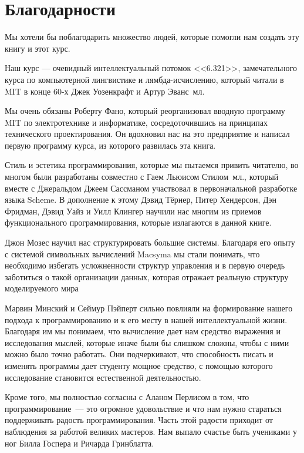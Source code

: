 \chapter*{Благодарности}
\thispagestyle{empty}
Мы хотели бы поблагодарить множество людей, которые помогли
нам создать эту книгу и этот курс.

Наш курс --- очевидный интеллектуальный потомок <<6.321>>,
замечательного курса по компьютерной лингвистике и лямбда-исчислению,
который читали в MIT в конце 60-х Джек Уозенкрафт и Артур Эванс~мл.

Мы очень обязаны Роберту Фано, который реорганизовал вводную 
программу MIT по электротехнике и информатике, сосредоточившись на
принципах технического проектирования.  Он вдохновил нас на это
предприятие и написал первую программу курса, из которого развилась
эта книга.

Стиль и эстетика программирования, которые мы
пытаемся привить читателю, во многом были разработаны совместно с Гаем
Льюисом Стилом~мл., 
который вместе с Джеральдом Джеем Сассманом участвовал в
первоначальной разработке языка Scheme. В дополнение к этому Дэвид
Тёрнер, Питер Хендерсон, Дэн Фридман, Дэвид Уайз и Уилл Клингер
научили нас многим из приемов функционального программирования,
которые излагаются в данной книге.

Джон Мозес научил нас структурировать большие системы.
Благодаря его опыту с системой символьных вычислений Macsyma мы стали
понимать,  
что необходимо избегать усложненности структур управления и в первую очередь
заботиться о такой организации данных, которая  отражает
реальную структуру моделируемого мира

Марвин Минский и Сеймур Пэйперт сильно повлияли на формирование
нашего подхода к программированию и к его месту в нашей интеллектуальной
жизни.  Благодаря им мы понимаем, что вычисление дает нам 
средство выражения и исследования мыслей, которые иначе были бы
слишком сложны, чтобы с ними можно было точно работать.  Они
подчеркивают, что способность писать и изменять
программы дает студенту мощное средство, с помощью которого исследование
становится естественной деятельностью.

Кроме того, мы полностью согласны с Аланом Перлисом в том, что
программирование~--- это огромное удовольствие и что нам нужно стараться
поддерживать радость программирования.  Часть этой
радости приходит от наблюдения за работой великих мастеров.  Нам
выпало счастье быть учениками у ног Билла Госпера и Ричарда
Гринблатта.

